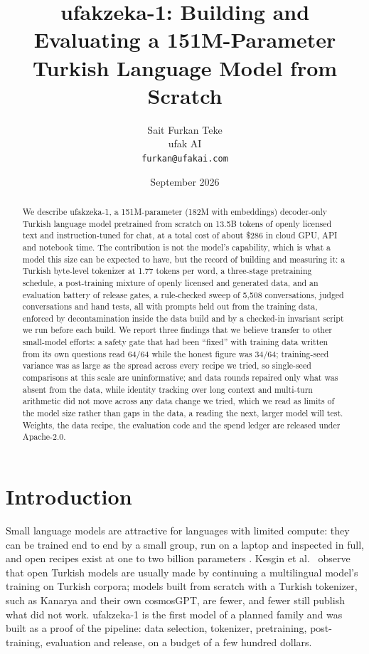 \documentclass[11pt]{article}
\title{ufakzeka-1: Building and Evaluating a 151M-Parameter\\ Turkish Language Model from Scratch}
\author{Sait Furkan Teke\\ ufak AI\\ \texttt{furkan@ufakai.com}}
\date{September 2026}
\begin{document}
\maketitle

\begin{abstract}
We describe ufakzeka-1, a 151M-parameter (182M with embeddings) decoder-only Turkish language model pretrained from scratch on 13.5B tokens of openly licensed text and instruction-tuned for chat, at a total cost of about \$286 in cloud GPU, API and notebook time. The contribution is not the model's capability, which is what a model this size can be expected to have, but the record of building and measuring it: a Turkish byte-level tokenizer at 1.77 tokens per word, a three-stage pretraining schedule, a post-training mixture of openly licensed and generated data, and an evaluation battery of release gates, a rule-checked sweep of 5,508 conversations, judged conversations and hand tests, all with prompts held out from the training data, enforced by decontamination inside the data build and by a checked-in invariant script we run before each build. We report three findings that we believe transfer to other small-model efforts: a safety gate that had been ``fixed'' with training data written from its own questions read 64/64 while the honest figure was 34/64; training-seed variance was as large as the spread across every recipe we tried, so single-seed comparisons at this scale are uninformative; and data rounds repaired only what was absent from the data, while identity tracking over long context and multi-turn arithmetic did not move across any data change we tried, which we read as limits of the model size rather than gaps in the data, a reading the next, larger model will test. Weights, the data recipe, the evaluation code and the spend ledger are released under Apache-2.0.
\end{abstract}

\section{Introduction}
Small language models are attractive for languages with limited compute: they can be trained end to end by a small group, run on a laptop and inspected in full, and open recipes exist at one to two billion parameters \cite{smollm2,minicpm}. Kesgin et al.~\cite{cosmosgpt} observe that open Turkish models are usually made by continuing a multilingual model's training on Turkish corpora; models built from scratch with a Turkish tokenizer, such as Kanarya \cite{kanarya} and their own cosmosGPT, are fewer, and fewer still publish what did not work. ufakzeka-1 is the first model of a planned family and was built as a proof of the pipeline: data selection, tokenizer, pretraining, post-training, evaluation and release, on a budget of a few hundred dollars.
\end{document}
